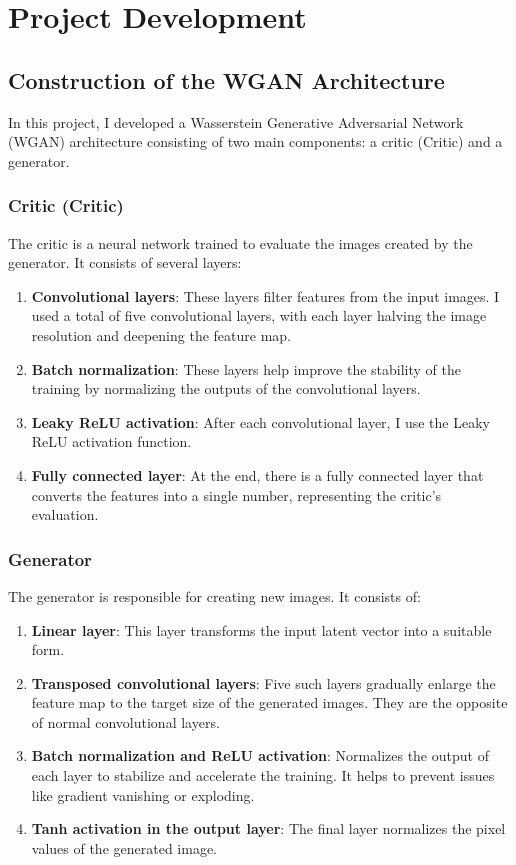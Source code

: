\documentclass[a4paper, 12pt]{article}
\begin{document}
\section{Project Development}
\subsection{Construction of the WGAN Architecture}

In this project, I developed a Wasserstein Generative Adversarial Network (WGAN) architecture consisting of two main components: a critic (Critic) and a generator.

\subsubsection{Critic (Critic)}

The critic is a neural network trained to evaluate the images created by the generator. It consists of several layers:

\begin{enumerate}
    \item \textbf{Convolutional layers}: These layers filter features from the input images. I used a total of five convolutional layers, with each layer halving the image resolution and deepening the feature map.
    \item \textbf{Batch normalization}: These layers help improve the stability of the training by normalizing the outputs of the convolutional layers.
    \item \textbf{Leaky ReLU activation}: After each convolutional layer, I use the Leaky ReLU activation function.
   

 \item \textbf{Fully connected layer}: At the end, there is a fully connected layer that converts the features into a single number, representing the critic's evaluation.
\end{enumerate}

\subsubsection{Generator}

The generator is responsible for creating new images. It consists of:

\begin{enumerate}
    \item \textbf{Linear layer}: This layer transforms the input latent vector into a suitable form.
    \item \textbf{Transposed convolutional layers}: Five such layers gradually enlarge the feature map to the target size of the generated images. They are the opposite of normal convolutional layers.
    \item \textbf{Batch normalization and ReLU activation}: Normalizes the output of each layer to stabilize and accelerate the training. It helps to prevent issues like gradient vanishing or exploding.
    \item \textbf{Tanh activation in the output layer}: The final layer normalizes the pixel values of the generated image.
\end{enumerate}
\end{document}
